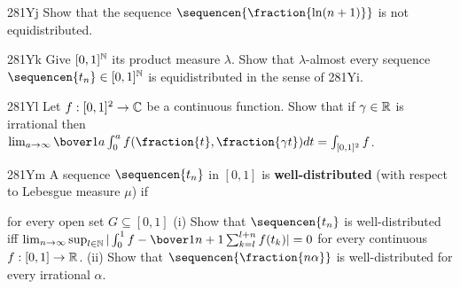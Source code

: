 {\spheader 281Yj Show that the sequence $\sequencen{\fraction{\ln(n+1)}}$ 
is not equidistributed. 
      
\spheader 281Yk Give $[0,1]^{\Bbb N}$ its product measure $\lambda$. 
Show that $\lambda$-almost every sequence 
$\sequencen{t_n}\in[0,1]^{\Bbb N}$ is equidistributed in the sense of 
281Yi.    
      
\spheader 281Yl Let $f:[0,1]^2\to\Bbb C$ be a continuous function. 
Show that if $\gamma\in\Bbb R$ is irrational then 
$\lim_{a\to\infty}\bover1a\int_0^af(\fraction{t},\fraction{\gamma t})dt 
\penalty-100=\int_{[0,1]^2}f$. 
 
\spheader 281Ym A sequence $\sequencen{t_n}$ in $[0,1]$ is  
{\bf well-distributed} (with respect to Lebesgue measure $\mu$) if  


\noindent for every open set $G\subseteq[0,1]$    
(i) Show that $\sequencen{t_n}$ is well-distributed iff  
$\lim_{n\to\infty}\sup_{l\in\Bbb N} 
|\int_0^1f-\bover1{n+1}\sum_{k=l}^{l+n}f(t_k)|=0$ for every continuous  
$f:[0,1]\to\Bbb R$.    
(ii) Show that $\sequencen{\fraction{n\alpha}}$ is well-distributed for  
every irrational $\alpha$. 
}%
      
